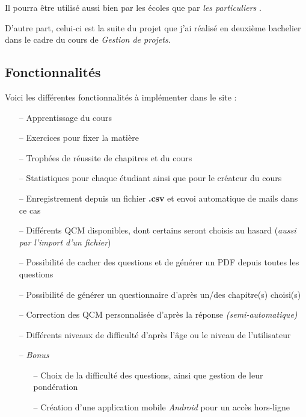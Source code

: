 Il pourra être utilisé aussi bien par les écoles que par \og \textit{les particuliers} \fg.

D'autre part, celui-ci est la suite du projet que j'ai réalisé en deuxième bachelier dans le cadre du cours de \textit{Gestion de projets}.

\newpage

\subsection{Fonctionnalités}
\label{subsec:fonctionnalites}
Voici les différentes fonctionnalités à implémenter dans le site :

\begin{itemize}

    \item[--] Apprentissage du cours
    
    \item[--] Exercices pour fixer la matière
    
    \item[--] Trophées de réussite de chapitres et du cours
    
    \item[--] Statistiques pour chaque étudiant ainsi que pour le créateur du cours
    
    \item[--] Enregistrement depuis un fichier \textbf{.csv} et envoi automatique de mails dans ce cas
    
    \item[--] Différents QCM disponibles, dont certains seront choisis au hasard (\textit{aussi par l'import d'un fichier})
    
    \item[--] Possibilité de cacher des questions et de générer un PDF depuis toutes les questions
    
    \item[--] Possibilité de générer un questionnaire d'après un/des chapitre(s) choisi(s)
    
    \item[--] Correction des QCM personnalisée d'après la réponse \textit{(semi-automatique)}
    
    \item[--] Différents niveaux de difficulté d'après l'âge ou le niveau de l'utilisateur
    
    
    \item[--] \textit{Bonus}
    
    \begin{itemize}
    
        \item[--] Choix de la difficulté des questions, ainsi que gestion de leur pondération
        
        \item[--] Création d'une application mobile \textit{Android} pour un accès hors-ligne
        
    \end{itemize}
    
\end{itemize}